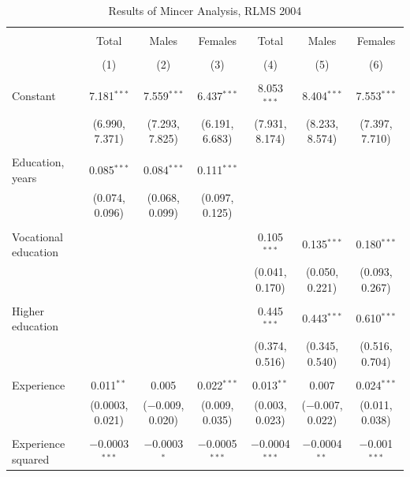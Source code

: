 \documentclass[alpha-refs]{wiley-article-01g}
\begin{document}
\begin{landscape}
	
	\fontsize{9}{11}
	\selectfont
	
	\begin{table}[!htbp] \centering 
\renewcommand{\arraystretch}{1.0}
		\caption{Results of Mincer Analysis, RLMS 2004} 
		\label{} 
		\begin{tabular}{@{\extracolsep{5pt}}lcccccc} 
			\\[-.8ex]\hline 
			\hline \\[-.8ex] 
			& Total & Males & Females & Total & Males & Females \\ 
			\\[-.8ex] & (1) & (2) & (3) & (4) & (5) & (6)\\ 
			\hline \\[-.8ex] 
			Constant & 7.181$^{***}$ & 7.559$^{***}$ & 6.437$^{***}$ & 8.053$^{***}$ & 8.404$^{***}$ & 7.553$^{***}$ \\ 
			& (6.990, 7.371) & (7.293, 7.825) & (6.191, 6.683) & (7.931, 8.174) & (8.233, 8.574) & (7.397, 7.710) \\ 
			& & & & & & \\ 
			Education, years & 0.085$^{***}$ & 0.084$^{***}$ & 0.111$^{***}$ &  &  &  \\ 
			& (0.074, 0.096) & (0.068, 0.099) & (0.097, 0.125) &  &  &  \\ 
			& & & & & & \\ 
			Vocational education &  &  &  & 0.105$^{***}$ & 0.135$^{***}$ & 0.180$^{***}$ \\ 
			&  &  &  & (0.041, 0.170) & (0.050, 0.221) & (0.093, 0.267) \\ 
			& & & & & & \\ 
			Higher education &  &  &  & 0.445$^{***}$ & 0.443$^{***}$ & 0.610$^{***}$ \\ 
			&  &  &  & (0.374, 0.516) & (0.345, 0.540) & (0.516, 0.704) \\ 
			& & & & & & \\ 
			Experience & 0.011$^{**}$ & 0.005 & 0.022$^{***}$ & 0.013$^{**}$ & 0.007 & 0.024$^{***}$ \\ 
			& (0.0003, 0.021) & ($-$0.009, 0.020) & (0.009, 0.035) & (0.003, 0.023) & ($-$0.007, 0.022) & (0.011, 0.038) \\ 
			& & & & & & \\ 
			Experience squared & $-$0.0003$^{***}$ & $-$0.0003$^{*}$ & $-$0.0005$^{***}$ & $-$0.0004$^{***}$ & $-$0.0004$^{**}$ & $-$0.001$^{***}$ \\ 

\end{tabular}
\end{table}
\end{landscape}
\end{document}
